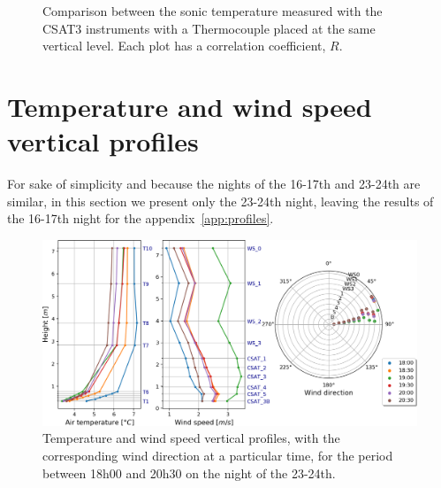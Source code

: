 \begin{figure}[!ht]
\begin{subfigure}[b]{0.48\textwidth}
        \label{fig:csat4_vs_TC6}
    \end{subfigure}
    \caption{Comparison between the sonic temperature measured with the CSAT3 instruments with a Thermocouple placed at the same vertical level. Each plot has a correlation coefficient, $R$.}
    \label{fig:csat_vs_TC}
\end{figure}



\section{Temperature and wind speed vertical profiles}

For sake of simplicity and because the nights of the 16-17th and 23-24th are similar, in this section we present only the 23-24th night, leaving the results of the 16-17th night for the appendix~\ref{app:profiles}. 


\begin{figure}[!ht]
    \centering
    \includegraphics[width=1\textwidth]{fig/chapter_4/23-24/18-21_profiles.png}
    \caption{Temperature and wind speed vertical profiles, with the corresponding wind direction at a particular time, for the period between 18h00 and 20h30 on the night of the 23-24th.}
    \label{fig:18-21_profiles.png}
\end{figure}

